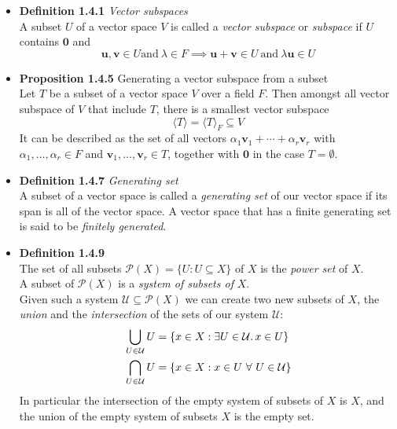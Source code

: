 \documentclass[11pt,a4paper]{article}
\begin{document}
\begin{itemize}

    \item \textbf{Definition 1.4.1} \emph{Vector subspaces} \\
        A subset $U$ of a vector space $V$ is called a \emph{vector subspace} or \emph{subspace}
        if $U$ contains $\textbf{0}$ and
        \[
            \textbf{u}, \textbf{v} \in U  \text{and} \ \lambda \in F \implies
            \textbf{u} + \textbf{v} \in U \ \text{and} \ \lambda \textbf{u} \in U
        \]

    \item \textbf{Proposition 1.4.5} Generating a vector subspace from a subset \\
        Let $T$ be a subset of a vector space $V$ over a field $F$.
        Then amongst all vector subspace of $V$ that include $T$,
        there is a smallest vector subspace
        \[
            \langle T \rangle = \langle T \rangle _F \subseteq V
        \]
        It can be described as the set of all vectors
        $\alpha_1 \textbf{v}_1 + \cdots + \alpha_r \textbf{v}_r$ with
        $\alpha_1, \ldots, \alpha_r \in F$ and $\textbf{v}_1, \ldots, \textbf{v}_r \in T$,
        together with $\textbf{0}$ in the case $T = \emptyset$.

    \item \textbf{Definition 1.4.7} \emph{Generating set} \\
        A subset of a vector space is called a \emph{generating set} of our vector space if its
        span is all of the vector space.
        A vector space that has a finite generating set is said to be \emph{finitely generated}.

    \item \textbf{Definition 1.4.9} \\
        The set of all subsets $\mathcal{P}(X) = \{U : U \subseteq X \}$ of $X$ is the
        \emph{power set} of $X$. \\
        A subset of $\mathcal{P}(X)$ is a \emph{system of subsets of} $X$. \\
        Given such a system $\mathcal{U} \subseteq \mathcal{P}(X)$ we can create two new subsets
        of $X$,
        the \emph{union} and the \emph{intersection} of the sets of our system $\mathcal{U}$:
        \begin{align*}{}
            \bigcup_{U \in \mathcal{U}} U &=
            \{x \in X : \exists U \in \mathcal{U} \ldotp x \in U\} \\
            \bigcap_{U \in \mathcal{U}} U &= \{x \in X : x \in U \ \forall \ U \in \mathcal{U}\}
        \end{align*}
        In particular the intersection of the empty system of subsets of $X$ is $X$,
        and the union of the empty system of subsets $X$ is the empty set.
\end{itemize}
\end{document}
